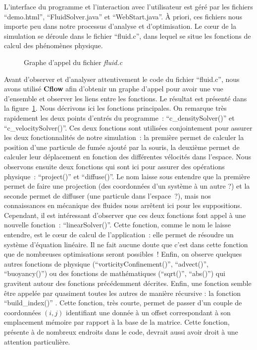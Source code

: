 \documentclass[12pt,a4paper]{article}
\makeatletter
\DeclareRobustCommand*{\escapeus}[1]{
    \begingroup\@activeus\scantokens{#1\endinput}\endgroup}
\makeatother
\begin{document}
L'interface du programme et l'interaction avec l'utilisateur est géré par les
fichiers \enquote{demo.html}, \enquote{FluidSolver.java} et
\enquote{WebStart.java}. À priori, ces fichiers nous importe peu dans notre
processus d'analyse et d'optimisation. Le cœur de la simulation se déroule dans
le fichier \enquote{fluid.c}, dans lequel se situe les fonctions de calcul des
phénomènes physique.

\begin{figure}[h]
    \centering
    {
        \scriptsize
        \escapeus{}
    }
    \caption{Graphe d'appel du fichier \textit{fluid.c}}
    \label{fig.analyze.callgraph}
\end{figure}

Avant d'observer et d'analyser attentivement le code du fichier
\enquote{fluid.c}, nous avons utilisé \textbf{Cflow} afin d'obtenir un graphe
d'appel pour avoir une vue d'ensemble et observer les liens entre les fonctions.
Le résultat est présenté dans la figure~\ref{fig.analyze.callgraph}. Nous
décrivons ici les fonctions principales. On remarque très rapidement les deux
points d'entrés du programme : \enquote{c\_densitySolver()} et
\enquote{c\_velocitySolver()}. Ces deux fonctions sont utilisées conjointement
pour assurer les deux fonctionnalités de notre simulation : la première permet
de calculer la position d'une particule de fumée ajouté par la souris, la
deuxième permet de calculer leur déplacement en fonction des différentes
vélocités dans l'espace. Nous observons ensuite deux fonctions qui sont ici pour
assurer des opérations physique : \enquote{project()} et \enquote{diffuse()}. Le
nom laisse sous entendre que la première permet de faire une projection (des
coordonnées d'un système à un autre ?) et la seconde permet de diffuser (une
particule dans l'espace ?), mais nos connaissances en mécanique des fluides nous
arrêtent ici pour les suppositions. Cependant, il est intéressant d'observer que
ces deux fonctions font appel à une nouvelle fonction :
\enquote{linearSolver()}. Cette fonction, comme le nom le laisse entendre, est
le cœur de calcul de l'application : elle permet de résoudre un système
d'équation linéaire. Il ne fait aucune doute que c'est dans cette fonction que
de nombreuses optimisations seront possibles ! Enfin, on observe quelques autres
fonctions de physique (\enquote{vorticityConfinement()}, \enquote{advect()},
\enquote{buoyancy()}) ou des fonctions de mathématiques (\enquote{sqrt()},
\enquote{abs()}) qui gravitent autour des fonctions précédemment décrites.
Enfin, une fonction semble être appelée par quasiment toutes les autres de
manière récursive : la fonction \enquote{build\_index()} . Cette fonction, très
courte, permet de passer d'un couple de coordonnées $(i, j)$ identifiant une
donnée à un offset correspondant à son emplacement mémoire par rapport à la base
de la matrice. Cette fonction, présente à de nombreux endroits dans le code,
devrait aussi avoir droit à une attention particulière.
\end{document}
